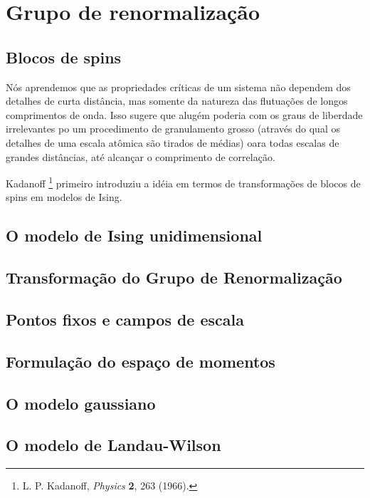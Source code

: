 \chapter{Grupo de renormaliza\c{c}\~ao}
\label{RG}
\noindent

\section{Blocos de spins}
\noindent

Nós aprendemos que as propriedades críticas de um sistema não dependem dos detalhes de curta distância, mas somente da natureza das flutuações de longos comprimentos de onda. Isso sugere que alugém poderia com os graus de liberdade irrelevantes po um procedimento de granulamento grosso (através do qual os detalhes de uma escala atômica são tirados de médias) oara todas escalas de grandes distâncias, até alcançar o comprimento de correlação.

Kadanoff \footnote{L. P. Kadanoff, {\it Physics} {\bf 2}, 263 (1966).} primeiro introduziu a idéia em termos de transformações de blocos de spins em modelos de Ising.

\section{O modelo de Ising unidimensional}
\noindent

\section{Transforma\c{c}\~ao do Grupo de Renormaliza\c{c}\~ao}
\noindent

\section{Pontos fixos e campos de escala}
\noindent

\section{Formula\c{c}\~ao do espa\c{c}o de momentos}
\noindent

\section{O modelo gaussiano}
\noindent

\section{O modelo de Landau-Wilson}
\noindent